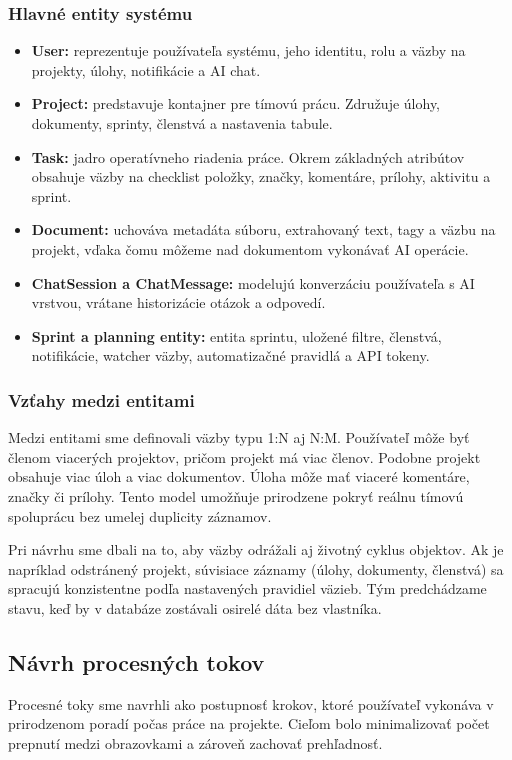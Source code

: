 \documentclass[12pt, a4paper]{article}
\begin{document}
\begin{titlepage}
\subsubsection{Hlavné entity systému}
\begin{itemize}
    \item \textbf{User:} reprezentuje používateľa systému, jeho identitu, rolu a väzby na projekty, úlohy, notifikácie a AI chat.
    \item \textbf{Project:} predstavuje kontajner pre tímovú prácu. Združuje úlohy, dokumenty, sprinty, členstvá a nastavenia tabule.
    \item \textbf{Task:} jadro operatívneho riadenia práce. Okrem základných atribútov obsahuje väzby na checklist položky, značky, komentáre, prílohy, aktivitu a sprint.
    \item \textbf{Document:} uchováva metadáta súboru, extrahovaný text, tagy a väzbu na projekt, vďaka čomu môžeme nad dokumentom vykonávať AI operácie.
    \item \textbf{ChatSession a ChatMessage:} modelujú konverzáciu používateľa s AI vrstvou, vrátane historizácie otázok a odpovedí.
    \item \textbf{Sprint a planning entity:} entita sprintu, uložené filtre, členstvá, notifikácie, watcher väzby, automatizačné pravidlá a API tokeny.
\end{itemize}

\subsubsection{Vzťahy medzi entitami}
Medzi entitami sme definovali väzby typu 1:N aj N:M. Používateľ môže byť členom viacerých projektov, pričom projekt má viac členov. Podobne projekt obsahuje viac úloh a viac dokumentov. Úloha môže mať viaceré komentáre, značky či prílohy. Tento model umožňuje prirodzene pokryť reálnu tímovú spoluprácu bez umelej duplicity záznamov.

Pri návrhu sme dbali na to, aby väzby odrážali aj životný cyklus objektov. Ak je napríklad odstránený projekt, súvisiace záznamy (úlohy, dokumenty, členstvá) sa spracujú konzistentne podľa nastavených pravidiel väzieb. Tým predchádzame stavu, keď by v databáze zostávali osirelé dáta bez vlastníka.

\subsection{Návrh procesných tokov}
Procesné toky sme navrhli ako postupnosť krokov, ktoré používateľ vykonáva v prirodzenom poradí počas práce na projekte. Cieľom bolo minimalizovať počet prepnutí medzi obrazovkami a zároveň zachovať prehľadnosť.


\end{titlepage}
\end{document}
